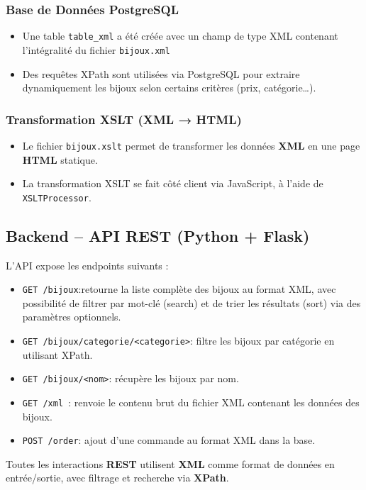 \documentclass[14pt]{extarticle}
\begin{document}
\subsubsection*{Base de Données PostgreSQL}
\begin{itemize}[label=-]
    \item Une table \texttt{table_xml} a été créée avec un champ de type XML contenant l'intégralité du fichier \texttt{bijoux.xml}
    \item Des requêtes XPath sont utilisées via PostgreSQL pour extraire dynamiquement les bijoux selon certains critères (prix, catégorie…).
\end{itemize}

\subsubsection*{Transformation XSLT (XML → HTML)}
\begin{itemize}[label=-]
    \item Le fichier \texttt{bijoux.xslt} permet de transformer les données \textbf{XML} en une page \textbf{HTML} statique.
    \item La transformation XSLT se fait côté client via JavaScript, à l’aide de \texttt{XSLTProcessor}.
\end{itemize}

\subsection*{Backend – API REST (Python + Flask)}
L’API expose les endpoints suivants :
\begin{itemize}[label=-]
    \item \texttt{GET /bijoux}:retourne la liste complète des bijoux au format XML, avec possibilité de filtrer par mot-clé (search) et de trier les résultats (sort) via des paramètres optionnels.
    \item \texttt{GET /bijoux/categorie/<categorie>}: filtre les bijoux par catégorie en utilisant XPath.
    \item \texttt{GET /bijoux/<nom>}:  récupère les bijoux par nom.
    \item \texttt{GET /xml }: renvoie le contenu brut du fichier XML contenant les données des bijoux.
    \item \texttt{POST /order}: ajout d’une commande au format XML dans la base.
\end{itemize}
Toutes les interactions \textbf{REST} utilisent \textbf{XML} comme format de données en entrée/sortie, avec filtrage et recherche via \textbf{XPath}.
\end{document}
